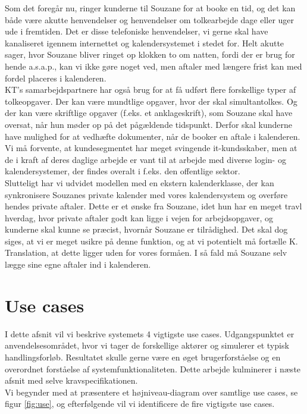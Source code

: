 \documentclass[12pt]{article}   %
\begin{document}
 Som det foregår nu, ringer kunderne til Souzane for at booke en tid, og det kan både være akutte henvendelser og henvendelser om tolkearbejde dage eller uger ude i fremtiden. Det er disse telefoniske henvendelser, vi gerne skal have kanaliseret igennem internettet og kalendersystemet i stedet for. Helt akutte sager, hvor Souzane bliver ringet op klokken to om natten, fordi der er brug for hende a.s.a.p., kan vi ikke gøre noget ved, men aftaler med længere frist kan med fordel placeres i kalenderen. \\
 KT's samarbejdspartnere har også brug for at få udført flere forskellige typer af tolkeopgaver. Der kan være mundtlige opgaver, hvor der skal simultantolkes. Og der kan være skriftlige opgaver (f.eks. et anklageskrift), som Souzane skal have oversat, når hun møder op på det pågældende tidspunkt. Derfor skal kunderne have mulighed for at vedhæfte dokumenter, når de booker en aftale i kalenderen. \\
Vi må forvente, at kundesegmentet har meget svingende it-kundsskaber, men at de i kraft af deres daglige arbejde er vant til at arbejde med diverse login- og kalendersystemer, der findes overalt i f.eks. den offentlige sektor. \\
Slutteligt har vi udvidet modellen med en ekstern kalenderklasse, der kan synkronisere Souzanes private kalender med vores kalendersystem og overføre hendes private
aftaler. Dette er et ønske fra Souzane, idet hun har en meget travl hverdag, hvor private aftaler godt kan ligge i vejen for arbejdsopgaver, og kunderne skal kunne se præcist, hvornår Souzane er tilrådighed. Det skal dog siges, at vi er meget usikre på denne funktion, og at vi potentielt må fortælle K. Translation, at dette ligger uden for vores formåen. I så fald må Souzane selv lægge sine egne aftaler ind i kalenderen. \\

\section{Use cases}
I dette afsnit vil vi beskrive systemets 4 vigtigste use cases. Udgangspunktet er anvendelsesområdet, hvor vi tager de forskellige aktører og simulerer et typisk handlingsforløb.  Resultatet skulle gerne være en øget brugerforståelse og en overordnet forståelse af systemfunktionaliteten. Dette arbejde kulminerer i næste afsnit med selve kravspecifikationen. \\
Vi begynder med at præsentere et højniveau-diagram over samtlige use cases, se figur \ref{fig:use}, og efterfølgende vil vi identificere de fire vigtigste use cases. 
\end{document}
